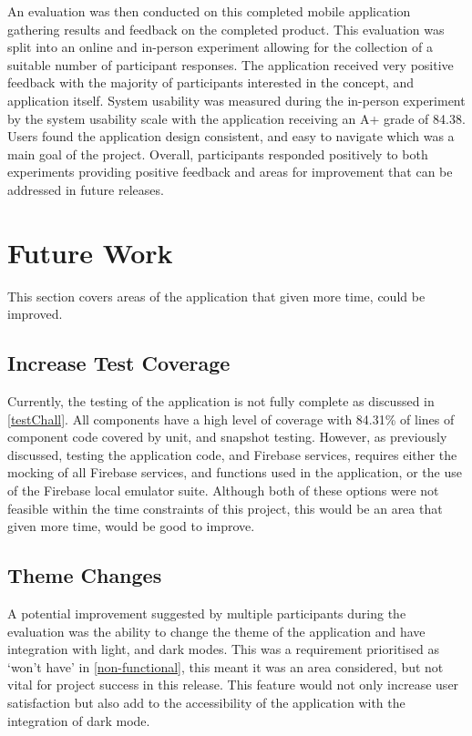 An evaluation was then conducted on this completed mobile application gathering results and feedback on the completed product. This evaluation was split into an online and in-person experiment allowing for the collection of a suitable number of participant responses. The application received very positive feedback with the majority of participants interested in the concept, and application itself. System usability was measured during the in-person experiment by the system usability scale with the application receiving an A+ grade of 84.38. Users found the application design consistent, and easy to navigate which was a main goal of the project. Overall, participants responded positively to both experiments providing positive feedback and areas for improvement that can be addressed in future releases.  


\section{Future Work}
This section covers areas of the application that given more time, could be improved.
\subsection*{Increase Test Coverage}
Currently, the testing of the application is not fully complete as discussed in \ref{testChall}. All components have a high level of coverage with 84.31\% of lines of component code covered by unit, and snapshot testing. However, as previously discussed, testing the application code, and Firebase services, requires either the mocking of all Firebase services, and functions used in the application, or the use of the Firebase local emulator suite. Although both of these options were not feasible within the time constraints of this project, this would be an area that given more time, would be good to improve.  

\subsection*{Theme Changes}
A potential improvement suggested by multiple participants during the evaluation was the ability to change the theme of the application and have integration with light, and dark modes. This was a requirement prioritised as `won't have' in \ref{non-functional}, this meant it was an area considered, but not vital for project success in this release. This feature would not only increase user satisfaction but also add to the accessibility of the application with the integration of dark mode.

